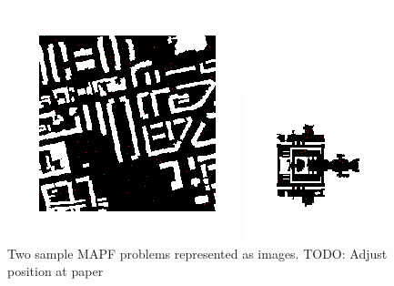 \documentclass[letterpaper]{article} %
\begin{document}
\begin{figure}
    \begin{minipage}[c]{0.4\linewidth}
        \includegraphics[width=\linewidth]{images/Berlin_1_256-71-5-label1.png}
    \end{minipage}
    \hfill
    \begin{minipage}[c]{0.4\linewidth}
        \includegraphics[width=\linewidth]{images/ht_chantry-31-1-label0.png}
    \end{minipage}%
\caption{Two sample MAPF problems represented as images. TODO: Adjust position at paper}
\label{fig:2}
\end{figure}
\end{document}
